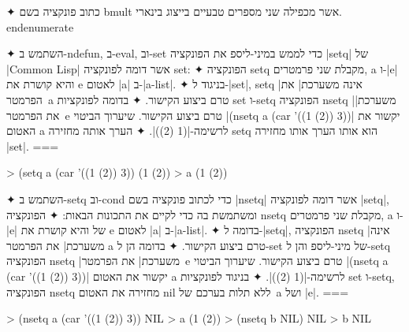 \begin{enumerate}
  ✦ כתוב פונקציה בשם bmult אשר מכפילה שני מספרים טבעיים בייצוג בינארי.
  end{enumerate}

  ✦ השתמש ב-ndefun, ב-eval, וב-set כדי לממש במיני-ליספ את הפונקציה \E|setq| של
  \E|Common Lisp| אשר דומה לפונקציה set:
  ✦ הפונקציה setq מקבלת שני פרמטרים, a ו-\E|e| והיא קושרת את e לאטום \E|a|
  ב-\E|a-list|.
  ✦ בניגוד ל-\E|set|, setq \ע|אינה משערכת| את הפרמטר~a טרם ביצוע הקישור.
  ✦ בדומה לפונקציות set ו-setq הפונקציה nsetq \ע|משערכת| את הפרמטר~e טרם ביצוע
  הקישור. שיערוך הביטוי \T|(nsetq a (car '((1 (2)) 3))| יקשור את האטום a
  לרשימה-\T|(1 (2))|.
  ✦ הערך אותה מחזירה setq הוא אותו הערך אותו מחזירה \E|set|.
===
  \begin{LISP}
> (setq a (car '((1 (2)) 3))
(1 (2))
> a
(1 (2))
\end{LISP}

  ✦ השתמש ב-setq וב-cond כדי לכתוב פונקציה בשם \E|nsetq| אשר דומה לפונקציה
  \E|setq|, ומשתמשת בה כדי לקיים את התכונות הבאות:
  ✦ הפונקציה nsetq מקבלת שני פרמטרים, a ו-\E|e| של והיא קושרת את e לאטום \E|a|
  ב-\E|a-list|.
  ✦ בדומה ל-\E|setq|, הפונקציה nsetq \ע|אינה משערכת| את הפרמטר a טרם ביצוע
  הקישור.
  ✦ בדומה הן ל-set של מיני-ליספ והן ל-setq הפונקציה nsetq \ע|משערכת| את
  הפרמטר~e טרם ביצוע הקישור. שיערוך הביטוי \T|(nsetq a (car '((1 (2)) 3))|
  יקשור את האטום a לרשימה-\T|(1 (2))|.
  ✦ בניגוד לפונקציות set ו-setq, הפונקציה nsetq מחזירה את האטום nil ללא תלות
  בערכם של~a ושל \E|e|.
===
  \begin{LISP}
> (nsetq a (car '((1 (2)) 3))
NIL
> a
(1 (2))
> (nsetq b NIL)
NIL
> b
NIL
\end{LISP}
\end{enumerate}
